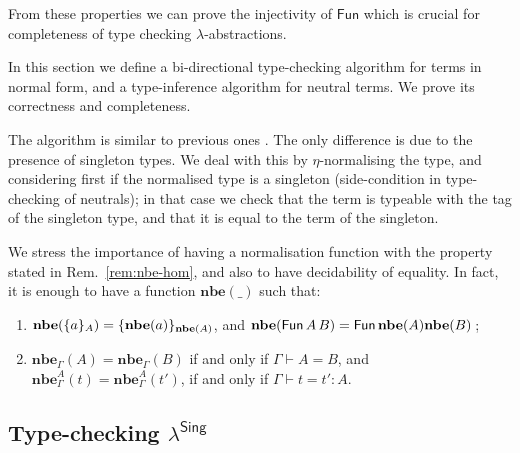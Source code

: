 \documentclass{LMCS}
\theoremstyle{plain}\newtheorem{satz}[thm]{Satz}
\newcommand{\lambdaSing}{\texorpdfstring{\ensuremath{\lambda^{\mathsf{Sing}}}}{Singletons}}
\newcommand{\F}[2]{\mathsf{Fun}\,#1\,#2}
\newcommand{\deqtype}[3]{#1\vdash#2=#3}
\newcommand{\deqterm}[4]{#1\vdash#3=#4:#2}
\newcommand{\nbe}[1]{\mathbf{nbe}(#1)}
\newcommand{\norm}[1]{\mathbf{nbe}(#1)}
\newcommand{\normty}[2]{\mathbf{nbe}_{#1}(#2)}
\newcommand{\normtm}[3]{\mathbf{nbe}_{#1}^{#2}(#3)}
\begin{document}
{  \noindent From these properties we can prove the injectivity of $\F{}{}$which
  is crucial for completeness of type checking $\lambda$-abstractions.
}{ 

  In this section we define a bi-directional type-checking algorithm
  for terms in normal form, and a type-inference algorithm for neutral
  terms. We prove its correctness and completeness.

  The algorithm is similar to previous ones
  \cite{coquand:type,abelCoquandDybjer:flops08}.  The only difference is
  due to the presence of singleton types. We deal with this by
  $\eta$-normalising the type, and considering first if the normalised
  type is a singleton (side-condition in type-checking of neutrals);
  in that case we check that the term is typeable with the tag of the
  singleton type, and that it is equal to the term of the singleton.

  We stress the importance of having a normalisation function with the
  property stated in Rem.~\ref{rem:nbe-hom}, and also to have
  decidability of equality. In fact, it is enough to have a function
  $\nbe{\_}$ such that:
  
    \begin{enumerate}
    \item $\norm{\singTm{a}{A}} = \singTm{\norm{a}}{\norm{A}}$, and
      $\norm{\F{A}{B}} = \F{\norm{A}{\norm{B}}}$; 
    \item $\normty{\Gamma}{A} = \normty{\Gamma}{B}$ if and only if 
      $\deqtype{\Gamma}{A}{B}$, and 
      $\normtm{\Gamma}{A}{t}= \normtm{\Gamma}{A}{t'}$, if and only if
      $\deqterm{\Gamma}{A}{t}{t'}$.
    \end{enumerate}  
}







\subsection{Type-checking \lambdaSing}
\end{document}

